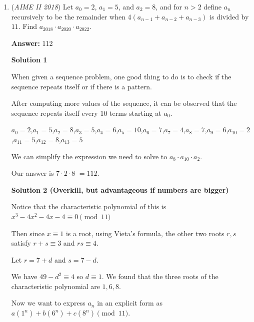 \begin{enumerate}
 For Ina to reach $B$, she must run a distance of $x$ at a speed of $2v$, taking her a time of $\frac{x}{2v}$. 

 Since Paul and Ina reach $B$ at the same time, we know that $\frac{2(1800-x)}{5v} = \frac{x}{2v}$ (notice that $v$ cancels out on both sides). Solving the equation gives $x = \boxed{800}$.

 


 


	\item (\textit{AIME II 2018}) Let $a_{0} = 2$, $a_{1} = 5$, and $a_{2} = 8$, and for $n > 2$ define $a_{n}$ recursively to be the remainder when $4(a_{n-1} + a_{n-2} + a_{n-3})$ is divided by $11$. Find $a_{2018} \cdot a_{2020} \cdot a_{2022}$.


 
 \textbf{Answer: }112



\textbf{Solution 1}

When given a sequence problem, one good thing to do is to check if the sequence repeats itself or if there is a pattern.

 After computing more values of the sequence, it can be observed that the sequence repeats itself every 10 terms starting at $a_{0}$.

 $a_{0} = 2$,$a_{1} = 5$,$a_{2} = 8$,$a_{3} = 5$,$a_{4} = 6$,$a_{5} = 10$,$a_{6} = 7$,$a_{7} = 4$,$a_{8} = 7$,$a_{9} = 6$,$a_{10} = 2$,$a_{11} = 5$,$a_{12} = 8$,$a_{13} = 5$

 We can simplify the expression we need to solve to $a_{8}\cdot a_{10} \cdot a_{2}$.

 Our answer is $7 \cdot 2 \cdot 8$ $= \boxed{112}$.

 



\textbf{Solution 2 (Overkill, but advantageous if numbers are bigger)}

Notice that the characteristic polynomial of this is $x^3-4x^2-4x-4\equiv 0\pmod{11}$

 Then since $x\equiv1$ is a root, using Vieta's formula, the other two roots $r,s$ satisfy $r+s\equiv3$ and $rs\equiv4$. 

 Let $r=7+d$ and $s=7-d$.

 We have $49-d^2\equiv4$ so $d\equiv1$. We found that the three roots of the characteristic polynomial are $1,6,8$.

 Now we want to express $a_n$ in an explicit form as $a(1^n)+b(6^n)+c(8^n)\pmod{11}$.


\end{enumerate}
